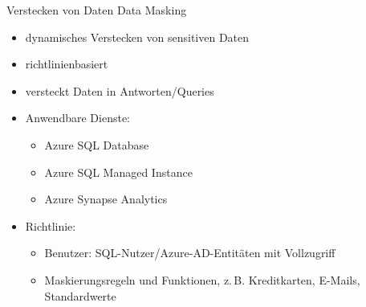 \begin{flashcard}[Definition]{Verstecken von Daten}
  Data Masking
  \begin{itemize}
    \item dynamisches Verstecken von sensitiven Daten
    \item richtlinienbasiert
    \item versteckt Daten in Antworten/Queries
    \item Anwendbare Dienste:
      \begin{itemize}
        \item Azure SQL Database
        \item Azure SQL Managed Instance
        \item Azure Synapse Analytics
      \end{itemize}
    \item Richtlinie:
      \begin{itemize}
        \item Benutzer: SQL-Nutzer/Azure-AD-Entitäten mit Vollzugriff
        \item Maskierungsregeln und Funktionen, z.\,B.\newline
          Kreditkarten, E-Mails, Standardwerte
      \end{itemize}
  \end{itemize}
\end{flashcard}

